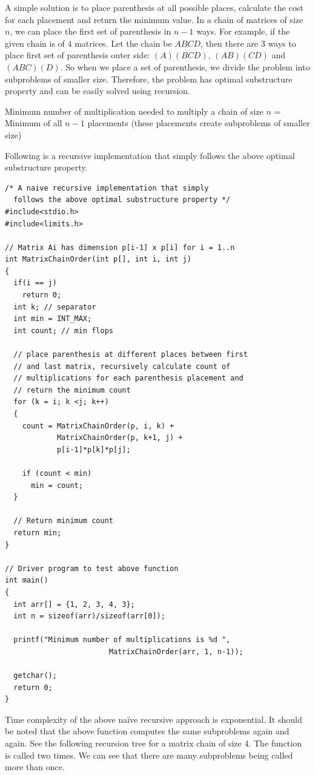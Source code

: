 \textbf{}


A simple solution is to place parenthesis at all possible places, calculate
the cost for each placement and return the minimum value. In a chain of
matrices of size $n$, we can place the first set of parenthesis in $n-1$
ways.  For example, if the given chain is of $4$ matrices. Let the chain be
$ABCD$, then there are 3 ways to place first set of parenthesis outer side:
$(A)(BCD)$, $(AB)(CD)$ and $(ABC)(D)$. So when we place a set of
parenthesis, we divide the problem into subproblems of smaller size.
Therefore, the problem has optimal substructure property and can be easily
solved using recursion.

Minimum number of multiplication needed to multiply a chain of size $n$ =
Minimum of all $n-1$ placements (these placements create subproblems of
smaller size)


Following is a recursive implementation that simply follows the above
optimal substructure property.
\begin{lstlisting}[style=raycppnewsnippet]
/* A naive recursive implementation that simply
  follows the above optimal substructure property */
#include<stdio.h>
#include<limits.h>
 
// Matrix Ai has dimension p[i-1] x p[i] for i = 1..n
int MatrixChainOrder(int p[], int i, int j)
{
  if(i == j)
    return 0;
  int k; // separator
  int min = INT_MAX;
  int count; // min flops
 
  // place parenthesis at different places between first
  // and last matrix, recursively calculate count of
  // multiplications for each parenthesis placement and
  // return the minimum count
  for (k = i; k <j; k++)
  {
    count = MatrixChainOrder(p, i, k) +
            MatrixChainOrder(p, k+1, j) +
            p[i-1]*p[k]*p[j];
 
    if (count < min)
      min = count;
  }
 
  // Return minimum count
  return min;
}

// Driver program to test above function
int main()
{
  int arr[] = {1, 2, 3, 4, 3};
  int n = sizeof(arr)/sizeof(arr[0]);
 
  printf("Minimum number of multiplications is %d ",
                        MatrixChainOrder(arr, 1, n-1));
 
  getchar();
  return 0;
}
\end{lstlisting}
Time complexity of the above na\"ive recursive approach is exponential. It
should be noted that the above function computes the same subproblems again
and again. See the following recursion tree for a matrix chain of size $4$.
The function  is called two times. We can see
that there are many subproblems being called more than once.

